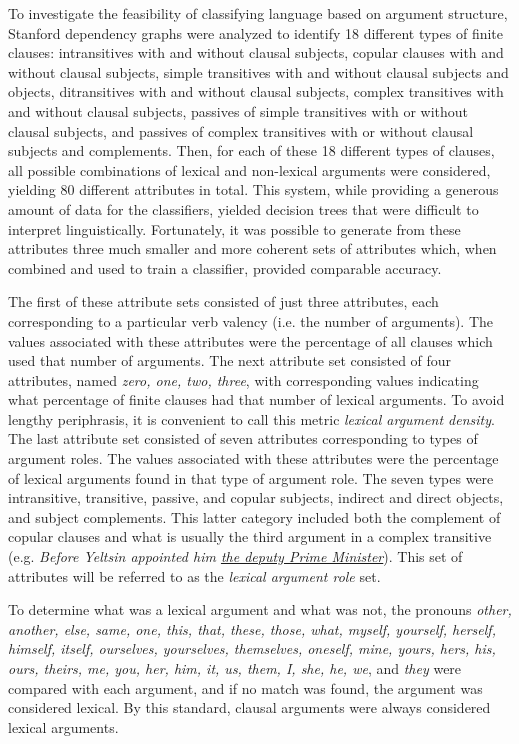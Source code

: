 \documentclass[main.tex]{subfiles}
\begin{document}
To investigate the feasibility of classifying language based on argument structure, Stanford dependency graphs were analyzed to identify 18 different types of finite clauses: intransitives with and without clausal subjects, copular clauses with and without clausal subjects, simple transitives with and without clausal subjects and objects, ditransitives with and without clausal subjects, complex transitives with and without clausal subjects, passives of simple transitives with or without clausal subjects, and passives of complex transitives with or without clausal subjects and complements. Then, for each of these 18 different types of clauses, all possible combinations of lexical and non-lexical arguments were considered, yielding 80 different attributes in total. This system, while providing a generous amount of data for the classifiers, yielded decision trees that were difficult to interpret linguistically. Fortunately, it was possible to generate from these attributes three much smaller and more coherent sets of attributes which, when combined and used to train a classifier, provided comparable accuracy.

The first of these attribute sets consisted of just three attributes, each corresponding to a particular verb valency (i.e. the number of arguments). The values associated with these attributes were the percentage of all clauses which used that number of arguments. The next attribute set consisted of four attributes, named \textit{zero, one, two, three}, with corresponding values indicating what percentage of finite clauses had that number of lexical arguments. To avoid lengthy periphrasis, it is convenient to call this metric \textit{lexical argument density}.  The last attribute set consisted of seven attributes corresponding to types of argument roles. The values associated with these attributes were the percentage of lexical arguments found in that type of argument role. The seven types were intransitive, transitive, passive, and copular subjects, indirect and direct objects, and subject complements. This latter category included both the complement of copular clauses and what is usually the third argument in a complex transitive (e.g. \textit{Before Yeltsin appointed him \underline{the deputy Prime Minister}}). This set of attributes will be referred to as the \textit{lexical argument role} set.

To determine what was a lexical argument and what was not, the pronouns \textit{other, another, else, same, one, this, that, these, those, what, myself, yourself, herself, himself, itself, ourselves, yourselves, themselves, oneself, mine, yours, hers, his, ours, theirs, me, you, her, him, it, us, them, I, she, he, we}, and \textit{they} were compared with each argument, and if no match was found, the argument was considered lexical. By this standard, clausal arguments were always considered lexical arguments. 
\end{document}
